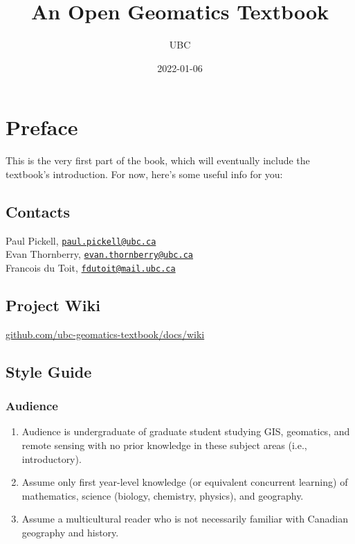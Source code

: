 \documentclass[
]{book}
\title{An Open Geomatics Textbook}
\author{UBC}
\date{2022-01-06}
\providecommand{\tightlist}{%
  \setlength{\itemsep}{0pt}\setlength{\parskip}{0pt}}
\begin{document}
\maketitle

{
\setcounter{tocdepth}{1}
\tableofcontents
}
\hypertarget{preface}{%
\chapter*{Preface}\label{preface}}

This is the very first part of the book, which will eventually include the textbook's introduction. For now, here's some useful info for you:

\hypertarget{contacts}{%
\section{Contacts}\label{contacts}}

Paul Pickell, \href{mailto:paul.pickell@ubc.ca}{\nolinkurl{paul.pickell@ubc.ca}}\\
Evan Thornberry, \href{mailto:evan.thornberry@ubc.ca}{\nolinkurl{evan.thornberry@ubc.ca}}\\
Francois du Toit, \href{mailto:fdutoit@mail.ubc.ca}{\nolinkurl{fdutoit@mail.ubc.ca}}

\hypertarget{project-wiki}{%
\section{Project Wiki}\label{project-wiki}}

\href{https://github.com/ubc-geomatics-textbook/docs/wiki}{github.com/ubc-geomatics-textbook/docs/wiki}

\hypertarget{style-guide}{%
\section{Style Guide}\label{style-guide}}

\hypertarget{audience}{%
\subsection{Audience}\label{audience}}

\begin{enumerate}
\def\labelenumi{\arabic{enumi}.}
\tightlist
\item
  Audience is undergraduate of graduate student studying GIS, geomatics, and remote sensing with no prior knowledge in these subject areas (i.e., introductory).
\item
  Assume only first year-level knowledge (or equivalent concurrent learning) of mathematics, science (biology, chemistry, physics), and geography.
\item
  Assume a multicultural reader who is not necessarily familiar with Canadian geography and history.
\end{enumerate}
\end{document}
